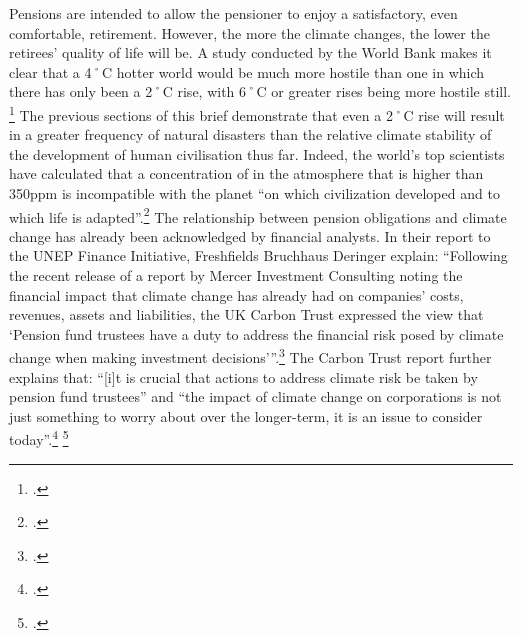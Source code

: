 \documentclass[10pt]{article}
\begin{document}
Pensions are intended to allow the pensioner to enjoy a satisfactory, even comfortable, retirement.
However, the more the climate changes, the lower the retirees' quality of life will be.
A study conducted by the World Bank makes it clear that a 4˚C hotter world would be much more hostile than one in which there has only been a 2˚C rise, with 6˚C or greater rises being more hostile still. \footcite{WorldBank4C}
The previous sections of this brief demonstrate that even a 2˚C rise will result in a greater frequency of natural disasters than the relative climate stability of the development of human civilisation thus far.
Indeed, the world's top scientists have calculated that a concentration of  in the atmosphere that is higher than 350ppm is incompatible with the planet ``on which civilization developed and to which life is adapted''.\footcite{TargetAtmosphere}
The relationship between pension obligations and climate change has already been acknowledged by financial analysts.
In their report to the UNEP Finance Initiative, Freshfields Bruchhaus Deringer explain: ``Following the recent release of a report by Mercer Investment Consulting noting the financial impact that climate change has already had on companies' costs, revenues, assets and liabilities, the UK Carbon Trust expressed the view that `Pension fund trustees have a duty to address the financial risk posed by climate change when making investment decisions'''.\footcite[][p. 11]{UNEPFinanceInit}
The Carbon Trust report further explains that: ``[i]t is crucial that actions to address climate risk be taken by pension fund trustees'' and ``the impact of climate change on corporations is not just something to worry about over the longer-term, it is an issue to consider today''.\footcite[][p. 2, 10]{TrusteesGuide} \footcite[See also: ][]{NorwayPensionFund}
\end{document}
